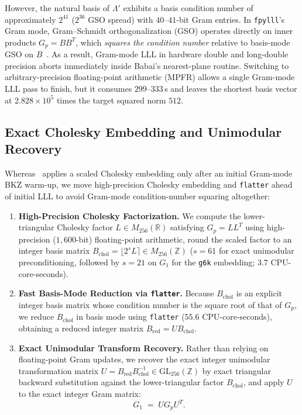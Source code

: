 \documentclass[11pt,a4paper]{article}
\theoremstyle{definition}
\newcommand{\Z}{\mathbb{Z}}
\newcommand{\R}{\mathbb{R}}
\newcommand{\Lp}{\Lambda'}
\begin{document}
However, the natural basis of $\Lp$ exhibits a basis condition number of approximately $2^{41}$ ($2^{36}$ GSO spread) with $40$--$41$-bit Gram entries. In \texttt{fpylll}'s Gram mode, Gram--Schmidt orthogonalization (GSO) operates directly on inner products $G_p = B B^T$, which \emph{squares the condition number} relative to basis-mode GSO on $B$~\cite{NS09,fplll}. As a result, Gram-mode LLL in hardware double and long-double precision aborts immediately inside Babai's nearest-plane routine. Switching to arbitrary-precision floating-point arithmetic (MPFR) allows a single Gram-mode LLL pass to finish, but it consumes $299$--$333$\,s and leaves the shortest basis vector at $2.828 \times 10^5$ times the target squared norm $512$.

\subsection{Exact Cholesky Embedding and Unimodular Recovery}
Whereas~\cite{SW26} applies a scaled Cholesky embedding only after an initial Gram-mode BKZ warm-up, we move high-precision Cholesky embedding and \texttt{flatter} ahead of initial LLL to avoid Gram-mode condition-number squaring altogether:
\begin{enumerate}[leftmargin=*]
\item \textbf{High-Precision Cholesky Factorization.} We compute the lower-triangular Cholesky factor $L \in M_{256}(\R)$ satisfying $G_p = L L^T$ using high-precision ($1{,}600$-bit) floating-point arithmetic, round the scaled factor to an integer basis matrix $B_{\mathrm{chol}} = \lfloor 2^s L \rceil \in M_{256}(\Z)$ ($s=61$ for exact unimodular preconditioning, followed by $s=21$ on $G_1$ for the \texttt{g6k} embedding; $3.7$ CPU-core-seconds).
\item \textbf{Fast Basis-Mode Reduction via \texttt{flatter}.} Because $B_{\mathrm{chol}}$ is an explicit integer basis matrix whose condition number is the square root of that of $G_p$, we reduce $B_{\mathrm{chol}}$ in basis mode using \texttt{flatter} ($55.6$ CPU-core-seconds), obtaining a reduced integer matrix $B_{\mathrm{red}} = U B_{\mathrm{chol}}$.
\item \textbf{Exact Unimodular Transform Recovery.} Rather than relying on floating-point Gram updates, we recover the exact integer unimodular transformation matrix $U = B_{\mathrm{red}} B_{\mathrm{chol}}^{-1} \in \mathrm{GL}_{256}(\Z)$ by exact triangular backward substitution against the lower-triangular factor $B_{\mathrm{chol}}$, and apply $U$ to the exact integer Gram matrix:
\begin{equation}\label{eq:g1-precond}
  G_1 \;=\; U G_p U^T.
\end{equation}
\end{enumerate}
\end{document}

